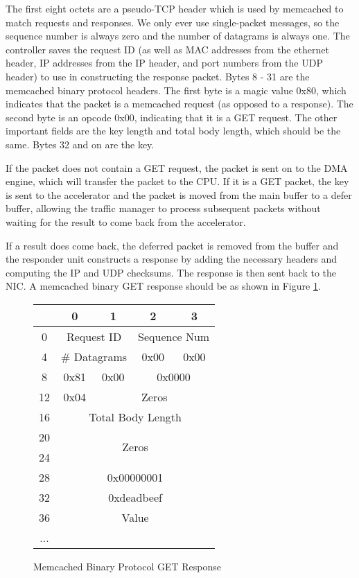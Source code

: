 The first eight octets are a pseudo-TCP header which is used by memcached to
match requests and responses. We only ever use single-packet messages,
so the sequence number is always zero and the number of datagrams is 
always one. The controller saves the request ID (as well as MAC addresses
from the ethernet header, IP addresses from the IP header, and port numbers
from the UDP header) to use in constructing the response packet.
Bytes 8 - 31 are the memcached binary protocol headers. The first byte is a
magic value 0x80, which indicates that the packet is a memcached request
(as opposed to a response). The second byte is an opcode 0x00, indicating that
it is a GET request. The other important fields are the key length and total
body length, which should be the same. Bytes 32 and on are the key.

If the packet does not contain a GET request, the packet
is sent on to the DMA engine, which will transfer the packet to the CPU.
If it is a GET packet, the key is sent to the accelerator and
the packet is moved from the main buffer to a defer buffer, allowing the
traffic manager to process subsequent packets without waiting for the result
to come back from the accelerator.

If a result does come back, the deferred packet is removed from the buffer and
the responder unit constructs a response by adding the necessary headers and
computing the IP and UDP checksums. The response is then sent back to the NIC.
A memcached binary GET response should be as shown in Figure \ref{fig:getresp}.

\begin{figure}
\begin{center}
    \begin{tabular}{|c|c|c|c|c|}
        \hline
          & 0 & 1 & 2 & 3 \\
        \hline
        0 & \multicolumn{2}{|c}{Request ID} & \multicolumn{2}{|c|}{Sequence Num} \\
        \hline
        4 & \multicolumn{2}{|c|}{\# Datagrams} & 0x00 & 0x00 \\
        \hline
        8 & 0x81 & 0x00 & \multicolumn{2}{c|}{0x0000} \\
        \hline
        12 & 0x04 & \multicolumn{3}{c|}{Zeros} \\
        \hline
        16 & \multicolumn{4}{|c|}{Total Body Length} \\
        \hline
        20 & \multicolumn{4}{|c|}{\multirow{2}{*}{Zeros}} \\
        \cline{1-1}
        24 & \multicolumn{4}{|c|}{} \\
        \hline
        28 & \multicolumn{4}{|c|}{0x00000001} \\
        \hline
        32 & \multicolumn{4}{|c|}{0xdeadbeef} \\
        \hline
        36 & \multicolumn{4}{|c|}{Value} \\
        ... & \multicolumn{4}{|c|}{} \\
        \hline
    \end{tabular}
        \caption{Memcached Binary Protocol GET Response}
        \label{fig:getresp}
    \end{center}
\end{figure}


